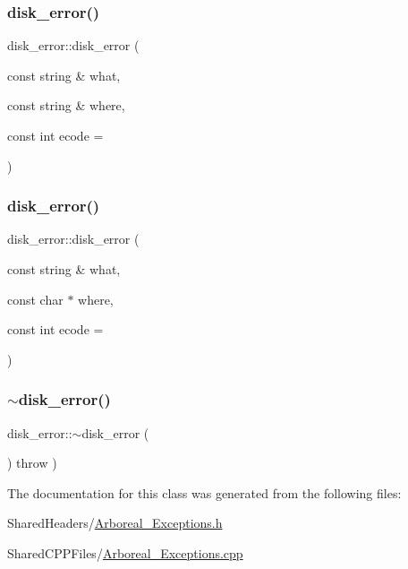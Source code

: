 \subsubsection{\texorpdfstring{disk\+\_\+error()}{disk\_error()}\hspace{0.1cm}{\footnotesize\ttfamily [3/4]}}
{\footnotesize\ttfamily disk\+\_\+error\+::disk\+\_\+error (\begin{DoxyParamCaption}\item[{const string \&}]{what,  }\item[{const string \&}]{where,  }\item[{const int}]{ecode = {} }\end{DoxyParamCaption})}

\mbox{\label{classdisk__error_a0288a245365c28dc6c48e5fd0c8fafd7}} 
\subsubsection{\texorpdfstring{disk\+\_\+error()}{disk\_error()}\hspace{0.1cm}{\footnotesize\ttfamily [4/4]}}
{\footnotesize\ttfamily disk\+\_\+error\+::disk\+\_\+error (\begin{DoxyParamCaption}\item[{const string \&}]{what,  }\item[{const char $\ast$}]{where,  }\item[{const int}]{ecode = {} }\end{DoxyParamCaption})}

\mbox{\label{classdisk__error_a399727e0ce763f46ca1a8abcd4433654}} 
\subsubsection{\texorpdfstring{$\sim$disk\+\_\+error()}{~disk\_error()}}
{\footnotesize\ttfamily disk\+\_\+error\+::$\sim$disk\+\_\+error (\begin{DoxyParamCaption}{ }\end{DoxyParamCaption}) throw  ) }



The documentation for this class was generated from the following files\+:\begin{DoxyCompactItemize}
\item 
Shared\+Headers/\mbox{\hyperlink{_arboreal___exceptions_8h}{Arboreal\+\_\+\+Exceptions.\+h}}\item 
Shared\+C\+P\+P\+Files/\mbox{\hyperlink{_arboreal___exceptions_8cpp}{Arboreal\+\_\+\+Exceptions.\+cpp}}\end{DoxyCompactItemize}
